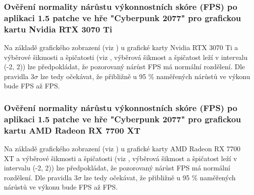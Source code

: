 \subsubsection*{Ověření normality nárůstu výkonnostních skóre (FPS) po aplikaci 1.5 patche ve hře "Cyberpunk 2077" pro grafickou kartu Nvidia RTX 3070 Ti}

Na základě grafického zobrazení (viz ) u grafické karty Nvidia RTX 3070 Ti a výběrové šikmosti a špičatosti (viz ,
výběrová šikmost a špičatost leží v intervalu (-2, 2)) lze předpokládat, že pozorovaný nárůst FPS má normální rozdělení. Dle pravidla 3$\sigma$ lze tedy očekávat,
že přibližně u 95 \% naměřených nárůstů ve výkonu bude  FPS až  FPS\@.

\subsubsection*{Ověření normality nárůstu výkonnostních skóre (FPS) po aplikaci 1.5 patche ve hře "Cyberpunk 2077" pro grafickou kartu AMD Radeon RX 7700 XT}

Na základě grafického zobrazení (viz ) u grafické karty AMD Radeon RX 7700 XT a výběrové šikmosti a špičatosti (viz ,
výběrová šikmost a špičatost leží v intervalu (-2, 2)) lze předpokládat, že pozorovaný nárůst FPS má normální rozdělení. Dle pravidla 3$\sigma$ lze tedy očekávat,
že přibližně u 95 \% naměřených nárůstů ve výkonu bude  FPS až  FPS\@.

\endinput